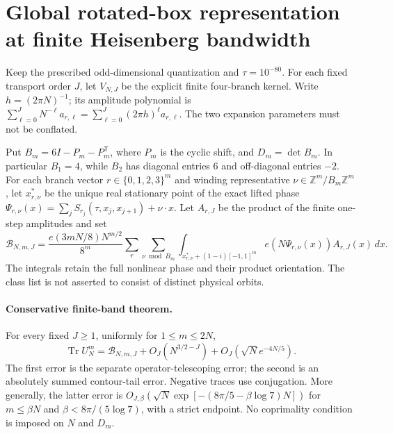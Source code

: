 \section{Global rotated-box representation at finite Heisenberg bandwidth}
\label{sec:global-rotated-box-trace}
Keep the prescribed odd-dimensional quantization and $\tau=10^{-80}$.
For each fixed transport order $J$, let $V_{N,J}$ be the explicit finite
four-branch kernel. Write $h=(2\pi N)^{-1}$; its amplitude polynomial is
$\sum_{\ell=0}^{J}N^{-\ell}a_{r,\ell}
=\sum_{\ell=0}^{J}(2\pi h)^\ell a_{r,\ell}$.
The two expansion parameters must not be conflated.

Put $B_m=6I-P_m-P_m^{\mathsf T}$, where $P_m$ is the cyclic shift,
and $D_m=\det B_m$. In particular $B_1=4$, while $B_2$ has diagonal
entries $6$ and off-diagonal entries $-2$.
For each branch vector $r\in\{0,1,2,3\}^m$ and winding representative
$\nu\in\mathbb Z^m/B_m\mathbb Z^m$, let $x^*_{r,\nu}$ be the unique
real stationary point of the exact lifted phase
$\Psi_{r,\nu}(x)=\sum_j S_{r_j}(\tau,x_j,x_{j+1})+\nu\cdot x$.
Let $A_{r,J}$ be the product of the finite one-step amplitudes and set
\[
 \mathcal B_{N,m,J}=
 \frac{e(3mN/8)N^{m/2}}{8^m}
 \sum_r\sum_{\nu\bmod B_m}
 \int_{x^*_{r,\nu}+(1-i)[-1,1]^m}
 e\!\left(N\Psi_{r,\nu}(x)\right) A_{r,J}(x)\,dx.
\]
The integrals retain the full nonlinear phase and their product orientation.
The class list is not asserted to consist of distinct physical orbits.

\paragraph{Conservative finite-band theorem.}
For every fixed $J\geq1$, uniformly for $1\le m\le2N$,
\[
 \operatorname{Tr}U_N^m
 =\mathcal B_{N,m,J}
 +O_J(N^{3/2-J})+O_J\!\left(\sqrt N e^{-4N/5}\right).
\]
The first error is the separate operator-telescoping error; the second is
an absolutely summed contour-tail error. Negative traces use conjugation.
More generally, the latter error is
$O_{J,\beta}(\sqrt N\exp[-(8\pi/5-\beta\log7)N])$ for
$m\le\beta N$ and $\beta<8\pi/(5\log7)$, with a strict endpoint.
No coprimality condition is imposed on $N$ and $D_m$.

